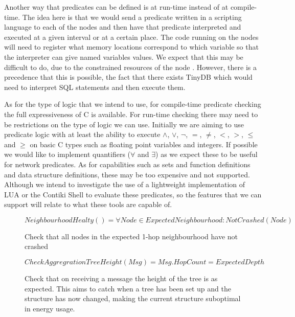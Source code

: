 \documentclass[a4paper]{article}
\begin{document}
Another way that predicates can be defined is at run-time instead of at
compile-time. The idea here is that we would send a predicate written in a
scripting language to each of the nodes and then have that predicate interpreted
and executed at a given interval or at a certain place. The code running on the
nodes will need to register what memory locations correspond to which variable
so that the interpreter can give named variables values. We expect that this may
be difficult to do, due to the constrained resources of the node \cite{CM5000}.
However, there is a precedence that this is possible, the fact that there exists
TinyDB \cite{TinyDB} which would need to interpret SQL statements and then execute
them.

As for the type of logic that we intend to use, for compile-time predicate
checking the full expressiveness of C is available. For run-time checking there
may need to be restrictions on the type of logic we can use. Initially we are
aiming to use predicate logic with at least the ability to execute $\land$,
$\lor$, $\lnot$, $=$, $\neq$, $<$, $>$, $\leq$ and $\geq$ on basic C types such
as floating point variables and integers. If possible we would like to implement
quantifiers ($\forall$ and $\exists$) as we expect these to be useful for
network predicates. As for capabilities such as sets and function definitions
and data structure definitions, these may be too expensive and not supported.
Although we intend to investigate the use of a lightweight implementation of LUA
\cite{elua} or the Contiki Shell to evaluate these predicates, so the
features that we can support will relate to what these tools are capable of.

\begin{figure}[H]
\begin{center}
    \begin{displaymath}
	NeighbourhoodHealty() = \forall Node \in ExpectedNeighbourhood : NotCrashed(Node)
	\end{displaymath}
	\caption{Check that all nodes in the expected 1-hop neighbourhood have
not crashed}
\end{center}
\end{figure}

\begin{figure}[H]
\begin{center}
    \begin{displaymath}
	CheckAggregrationTreeHeight(Msg) = Msg.HopCount = ExpectedDepth
	\end{displaymath}
	\caption{Check that on receiving a message the height of the tree is as
expected. This aims to catch when a tree has been set up and the structure has
now changed, making the current structure suboptimal in energy usage.}
\end{center}
\end{figure}
\end{document}
